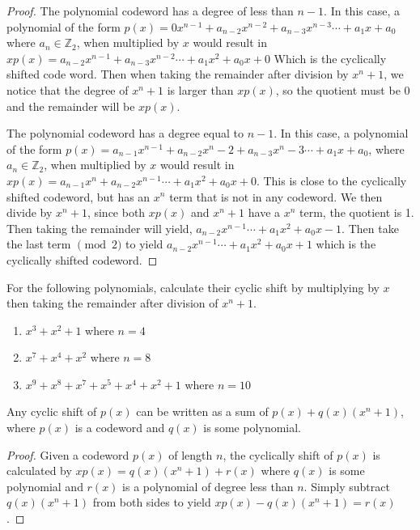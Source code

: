 \begin {proof}{}

The polynomial codeword has a degree of less than $n-1$. In this case, a polynomial of the form $p(x)= 0x^{n-1} + a_{n-2}x^{n-2} + a_{n-3}x^{n-3} \cdots + a_{1}x + a_0$ where $a_n \in \mathbb{Z}_2$, when multiplied by $x$ would result in $xp(x)=a_{n-2}x^{n-1} + a_{n-3}x^{n-2} \cdots + a_1x^2 + a_{0}x + 0$ Which is the cyclically shifted code word.  Then when taking the remainder after division by $x^n + 1$, we notice that the degree of $x^n + 1$ is larger than $xp(x)$, so the quotient must be 0 and the remainder will be $xp(x)$.

 
The polynomial codeword has a degree equal to $n-1$.  In this case, a polynomial of the form $p(x)= a_{n-1}x^{n-1} + a_{n-2}x^n-2 + a_{n-3}x^n-3 \cdots + a_{1}x + a_0$, where $a_n \in \mathbb{Z}_2$, when multiplied by $x$ would result in $xp(x)=a_{n-1}x^n + a_{n-2}x^{n-1} \cdots + a_1x^2 + a_{0}x + 0$.  This is close to the cyclically shifted codeword, but has an $x^n$ term that is not in any codeword.  We then divide by $x^n + 1$, since both $xp(x)$ and $x^n + 1$ have a $x^n$ term, the quotient is 1.  Then taking the remainder will yield, $a_{n-2}x^{n-1} \cdots + a_1x^2 + a_{0}x - 1$.  Then take the last term $\pmod2$ to yield $a_{n-2}x^{n-1} \cdots + a_1x^2 + a_{0}x + 1$ which is the cyclically shifted codeword.
\end{proof}

\begin {exercise} {}
For the following polynomials, calculate their cyclic shift by multiplying by $x$ then taking the remainder after division of $x^n + 1$.
\begin {enumerate}[a]
\item
$x^3 + x^2 + 1$ where $n=4$
\item
$x^7 + x^4 + x^2$ where $n=8$
\item
$x^9 + x^8 + x^7 + x^5 + x^4 +x^2 + 1$ where $n=10$
\end {enumerate}
\end {exercise}

\begin {prop}{}
Any cyclic shift of $p(x)$ can be written as a sum of $p(x) + q(x)(x^n + 1)$, where $p(x)$ is a codeword and $q(x)$ is some polynomial.  
\end {prop}

\begin {proof}
Given a codeword $p(x)$ of length $n$, the cyclically shift of $p(x)$ is calculated by $xp(x) = q(x)(x^n + 1) + r(x)$ where $q(x)$ is some polynomial and $r(x)$ is a polynomial of degree less than $n$.  Simply subtract $q(x)(x^n + 1)$ from both sides to yield $xp(x) - q(x)(x^n + 1) = r(x)$.
\end {proof}


